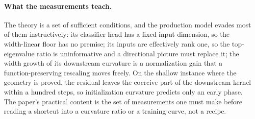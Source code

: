 \paragraph{What the measurements teach.}
The theory is a set of sufficient conditions, and the production model
evades most of them instructively: its classifier head has a fixed input
dimension, so the width-linear floor has no premise; its inputs are
effectively rank one, so the top-eigenvalue ratio is uninformative and a
directional picture must replace it; the width growth of its downstream
curvature is a normalization gain that a function-preserving rescaling moves
freely. On the shallow instance where the geometry is proved, the residual
leaves the coercive part of the downstream kernel within a hundred steps, so
initialization curvature predicts only an early phase. The paper's practical
content is the set of measurements one must make before reading a shortcut
into a curvature ratio or a training curve, not a recipe.
